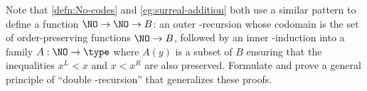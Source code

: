 \begin{ex}\label{ex:double-No-recursion}
  Note that \cref{defn:No-codes} and \cref{eg:surreal-addition} both use a similar pattern to define a function $\NO \to \NO \to B$: an outer \NO-recursion whose codomain is the set of order-preserving functions $\NO\to B$, followed by an inner \NO-induction into a family $A:\NO\to\type$ where $A(y)$ is a subset of $B$ ensuring that the inequalities $x^L<x$ and $x<x^R$ are also preserved.
  Formulate and prove a general principle of ``double \NO-recursion'' that generalizes these proofs.
\end{ex}

%

